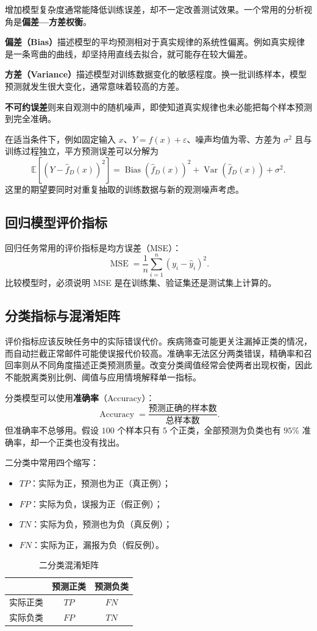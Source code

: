 增加模型复杂度通常能降低训练误差，却不一定改善测试效果。一个常用的分析视角是\textbf{偏差—方差权衡}。

\textbf{偏差（Bias）}描述模型的平均预测相对于真实规律的系统性偏离。例如真实规律是一条弯曲的曲线，却坚持用直线去拟合，就可能存在较大偏差。

\textbf{方差（Variance）}描述模型对训练数据变化的敏感程度。换一批训练样本，模型预测就发生很大变化，通常意味着较高的方差。

\textbf{不可约误差}则来自观测中的随机噪声，即使知道真实规律也未必能把每个样本预测到完全准确。

在适当条件下，例如固定输入 $x$、$Y=f(x)+\varepsilon$、噪声均值为零、方差为 $\sigma^2$ 且与训练过程独立，平方预测误差可以分解为
\begin{equation}\label{eq:bias-var-decomp}
\mathbb E[(Y-\hat f_D(x))^2]
=\operatorname{Bias}(\hat f_D(x))^2
+\operatorname{Var}(\hat f_D(x))+\sigma^2.
\end{equation}
这里的期望要同时对重复抽取的训练数据与新的观测噪声考虑。

\subsection{回归模型评价指标}

回归任务常用的评价指标是均方误差（MSE）：
\[
\operatorname{MSE}=\frac1n\sum_{i=1}^{n}(y_i-\hat y_i)^2.
\]
比较模型时，必须说明 MSE 是在训练集、验证集还是测试集上计算的。

\subsection{分类指标与混淆矩阵}

评价指标应该反映任务中的实际错误代价。疾病筛查可能更关注漏掉正类的情况，而自动拦截正常邮件可能使误报代价较高。准确率无法区分两类错误，精确率和召回率则从不同角度描述正类预测质量。改变分类阈值经常会使两者出现权衡，因此不能脱离类别比例、阈值与应用情境解释单一指标。

分类模型可以使用\textbf{准确率}（Accuracy）：
\[
\operatorname{Accuracy}=\frac{\text{预测正确的样本数}}{\text{总样本数}}.
\]
但准确率不总够用。假设 $100$ 个样本只有 $5$ 个正类，全部预测为负类也有 $95\%$ 准确率，却一个正类也没有找出。

二分类中常用四个缩写：
\begin{itemize}
\item $TP$：实际为正，预测也为正（真正例）；
\item $FP$：实际为负，误报为正（假正例）；
\item $TN$：实际为负，预测也为负（真反例）；
\item $FN$：实际为正，漏报为负（假反例）。
\end{itemize}
\begin{table}[htbp]\centering
\caption{二分类混淆矩阵}\label{tab:confusion}
\begin{tabular}{lcc}\toprule
&预测正类&预测负类\\\midrule
实际正类&$TP$&$FN$\\
实际负类&$FP$&$TN$\\\bottomrule
\end{tabular}\end{table}


